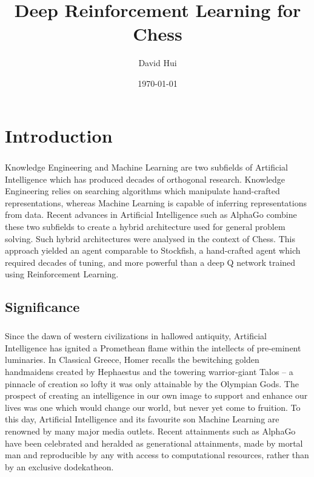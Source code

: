 \documentclass[a4paper]{book}
\title{Deep Reinforcement Learning for Chess}
\date{\today}
\author{David Hui}
\begin{document}
\maketitle
\tableofcontents


\chapter{Introduction}

\paragraph{} Knowledge Engineering and Machine Learning are two subfields of Artificial Intelligence which has produced decades of orthogonal research. Knowledge Engineering relies on searching algorithms which manipulate hand-crafted representations, whereas Machine Learning is capable of inferring representations from data. Recent advances in Artificial Intelligence such as AlphaGo combine these two subfields to create a hybrid architecture used for general problem solving. Such hybrid architectures were analysed in the context of Chess. This approach yielded an agent comparable to Stockfish, a hand-crafted agent which required decades of tuning, and more powerful than a deep Q network trained using Reinforcement Learning.

\section{Significance}

\paragraph{} Since the dawn of western civilizations in hallowed antiquity, Artificial Intelligence has ignited a Promethean flame within the intellects of pre-eminent luminaries. In Classical Greece, Homer recalls the bewitching golden handmaidens created by Hephaestus and the towering warrior-giant Talos -- a pinnacle of creation so lofty it was only attainable by the Olympian Gods. The prospect of creating an intelligence in our own image to support and enhance our lives was one which would change our world, but never yet come to fruition. To this day, Artificial Intelligence and its favourite son Machine Learning are renowned by many major media outlets. Recent attainments such as AlphaGo have been celebrated and heralded as generational attainments, made by mortal man and reproducible by any with access to computational resources, rather than by an exclusive dodekatheon.
\end{document}
